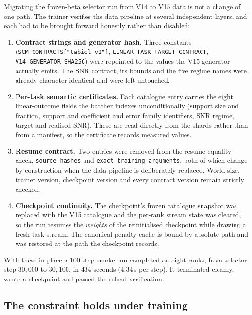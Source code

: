 \documentclass[11pt]{article}
\begin{document}
Migrating the frozen-beta selector run from V14 to V15 data is not a change of
one path. The trainer verifies the data pipeline at several independent
layers, and each had to be brought forward honestly rather than disabled:

\begin{enumerate}
\itemsep2pt
\item \textbf{Contract strings and generator hash.} Three constants
      (\texttt{SCM\_CONTRACTS["tabicl\_v2"]},
      \texttt{LINEAR\_TASK\_TARGET\_CONTRACT}, \texttt{V14\_GENERATOR\_SHA256})
      were repointed to the values the V15 generator actually emits. The SNR
      contract, its bounds and the five regime names were already
      character-identical and were left untouched.
\item \textbf{Per-task semantic certificates.} Each catalogue entry carries the
      eight linear-outcome fields the batcher indexes unconditionally
      (support size and fraction, support and coefficient and error family
      identifiers, SNR regime, target and realised SNR). These are read
      directly from the shards rather than from a manifest, so the certificate
      records measured values.
\item \textbf{Resume contract.} Two entries were removed from the resume
      equality check, \texttt{source\_hashes} and
      \texttt{exact\_training\_arguments}, both of which change by
      construction when the data pipeline is deliberately replaced. World
      size, trainer version, checkpoint version and every contract version
      remain strictly checked.
\item \textbf{Checkpoint continuity.} The checkpoint's frozen catalogue
      snapshot was replaced with the V15 catalogue and the per-rank stream
      state was cleared, so the run resumes the \emph{weights} of the
      reinitialised checkpoint while drawing a fresh task stream. The
      canonical penalty cache is bound by absolute path and was restored at
      the path the checkpoint records.
\end{enumerate}

With these in place a $100$-step smoke run completed on eight ranks, from
selector step $30{,}000$ to $30{,}100$, in $434$ seconds ($4.34$\,s per step).
It terminated cleanly, wrote a checkpoint and passed the reload verification.

\subsection{The constraint holds under training}
\label{sec:kappa_under_training}
\end{document}
